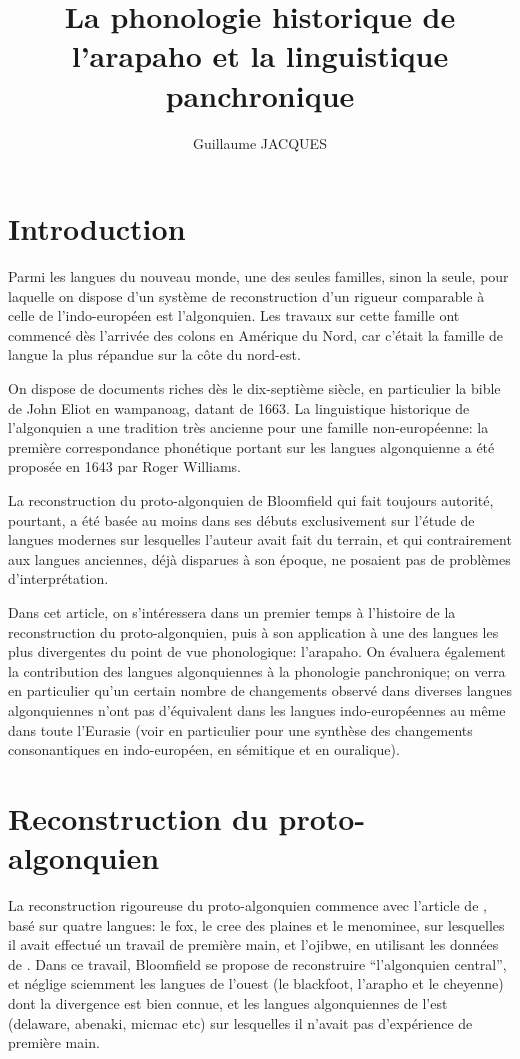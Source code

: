 \documentclass[twoside,a4paper,11pt]{article}
\newcommand{\Σ}{\greek{Σ}}
\begin{document}
\title{La phonologie historique de l'arapaho et la linguistique panchronique }

\author{Guillaume JACQUES }
\maketitle

\section{Introduction}
 	Parmi les langues du nouveau monde, une des seules familles, sinon la seule, pour laquelle on dispose d'un système de reconstruction d'un rigueur comparable à celle de l'indo-européen est l'algonquien. Les travaux sur cette famille ont commencé dès l'arrivée des colons en Amérique du Nord, car c'était la famille de langue la plus répandue sur la côte du nord-est. 
 	
	On dispose de documents riches dès le dix-septième siècle, en particulier la bible de John Eliot en wampanoag, datant de 1663. La linguistique historique de l'algonquien a une tradition très ancienne pour une famille non-européenne: la première correspondance phonétique portant sur les langues algonquienne a été proposée en 1643 par Roger Williams.
	
	
	La reconstruction du proto-algonquien de Bloomfield qui fait toujours autorité, pourtant, a été basée au moins dans ses débuts exclusivement sur l'étude de langues modernes sur lesquelles l'auteur avait fait du terrain, et qui contrairement aux langues anciennes, déjà disparues à son époque, ne posaient pas de problèmes d'interprétation.
	
	Dans cet article, on s'intéressera dans un premier temps à l'histoire de la reconstruction du proto-algonquien, puis à son application à une des langues les plus divergentes du point de vue phonologique: l'arapaho. On évaluera également la contribution des langues algonquiennes à la phonologie panchronique; on verra en particulier qu'un certain nombre de changements observé dans diverses langues algonquiennes n'ont pas d'équivalent dans les langues indo-européennes au même dans toute l'Eurasie (voir en particulier \citet{kuemmel07wandel} pour une synthèse des changements consonantiques en indo-européen,  en sémitique et en ouralique).
	
\section{Reconstruction du proto-algonquien}	
La reconstruction rigoureuse du proto-algonquien commence avec l'article de \citet{bloomfield25central}, basé sur quatre langues: le fox, le cree des plaines et le menominee, sur lesquelles il avait effectué un travail de première main, et l'ojibwe, en utilisant les données de \citet{jones17ojibwe}. Dans ce travail, Bloomfield se propose de reconstruire ``l'algonquien central'', et néglige sciemment les langues de l'ouest (le blackfoot, l'arapho et le cheyenne) dont la divergence est bien connue, et les langues algonquiennes de l'est (delaware, abenaki, micmac etc) sur lesquelles il n'avait pas d'expérience de première main.
\end{document}
